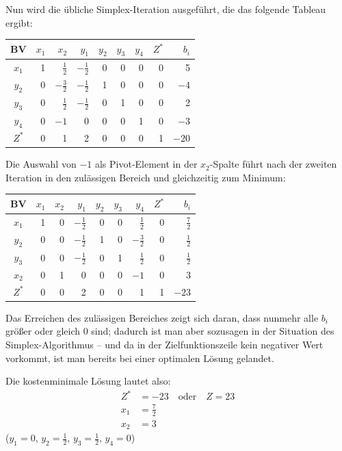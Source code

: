 Nun wird die übliche Simplex-Iteration ausgeführt, die das folgende Tableau ergibt:

\begin{center}
  \begin{tabular}{|c|r|r|r|r|r|r|r|r|}
    \hline
    BV & $x_1$ & $x_2$ & $y_1$ & $y_2$ & $y_3$ & $y_4$ & $Z^*$ & $b_i$\\
    \hline
    $x_1$ & 1 & $\tfrac{1}{2}$ & $-\tfrac{1}{2}$ & 0 & 0 & 0 & 0 & 5\\
    $y_2$ & 0 & $-\tfrac{3}{2}$ & $-\tfrac{1}{2}$ & 1 & 0 & 0 & 0 & $-4$\\
    $y_3$ & 0 & $\tfrac{1}{2}$ & $-\tfrac{1}{2}$ & 0 & 1 & 0 & 0 & 2\\
    $y_4$ & 0 & $-1$ & 0 & 0 & 0 & 1 & 0 & $-3$\\
    $Z^*$ & 0 & 1 & 2 & 0 & 0 & 0 & 1 & $-20$\\
    \hline
  \end{tabular}
\end{center}

Die Auswahl von $-1$ als Pivot-Element in der $x_2$-Spalte führt nach der zweiten Iteration in den zulässigen Bereich und gleichzeitig zum Minimum:

\begin{center}
  \begin{tabular}{|c|r|r|r|r|r|r|r|r|}
    \hline
    BV & $x_1$ & $x_2$ & $y_1$ & $y_2$ & $y_3$ & $y_4$ & $Z^*$ & $b_i$\\
    \hline
    $x_1$ & 1 & 0 & $-\tfrac{1}{2}$ & 0 & 0 & $\tfrac{1}{2}$ & 0 & $\tfrac{7}{2}$\\
    $y_2$ & 0 & 0 & $-\tfrac{1}{2}$ & 1 & 0 & $-\tfrac{3}{2}$ & 0 & $\tfrac{1}{2}$\\
    $y_3$ & 0 & 0 & $-\tfrac{1}{2}$ & 0 & 1 & $\tfrac{1}{2}$ & 0 & $\tfrac{1}{2}$\\
    $x_2$ & 0 & 1 & 0 & 0 & 0 & $-1$ & 0 & 3\\
    $Z^*$ & 0 & 0 & 2 & 0 & 0 & 1 & 1 & $-23$\\
    \hline
  \end{tabular}
\end{center}

Das Erreichen des zulässigen Bereiches zeigt sich daran, dass nunmehr alle $b_i$ größer oder gleich 0 sind; dadurch ist man aber sozusagen in der Situation des Simplex-Algorithmus -- und da in der Zielfunktionszeile kein negativer Wert vorkommt, ist man bereits bei einer optimalen Lösung gelandet.

Die kostenminimale Lösung lautet also:
\begin{align*}
  Z^* &= -23 \quad \text{oder} \quad Z = 23\\
  x_1 &= \tfrac{7}{2}\\
  x_2 &= 3
\end{align*}
($y_1 = 0$, $y_2 = \tfrac{1}{2}$, $y_3 = \tfrac{1}{2}$, $y_4 = 0$)

